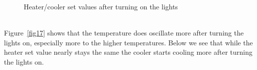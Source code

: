 \documentclass[12pt]{scrartcl}
\begin{document}
      \begin{figure}[h!]
        \hspace{-40pt}
        \hspace{-20pt}
        \caption{Heater/cooler set values after turning on the lights}
        \label{fig18}
      \end{figure}\\
      \noindent Figure~\ref{fig17} shows that the temperature does oscillate more after
      turning the lights on, especially more to the higher temperatures.
      Below we see that while the heater set value nearly stays the same the
      cooler starts cooling more after turning the lights on.
      \newpage
\end{document}
